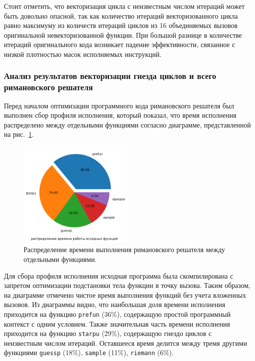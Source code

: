 Стоит отметить, что векторизация цикла с неизвестным числом итераций может быть довольно опасной, так как количество итераций векторизованного цикла равно максимуму из количеств итераций циклов из 16 объединяемых вызовов оригинальной невекторизованной функции.
При большой разнице в количестве итераций оригинального кода возникает падение эффективности, связанное с низкой плотностью масок\label{term:vector_mask_density4} исполняемых инструкций.

\subsubsection{Анализ результатов векторизации гнезда циклов и всего римановского решателя}

Перед началом оптимизации программного кода римановского решателя был выполнен сбор профиля исполнения\label{term:execution_profile2}, который показал, что время исполнения распределено между отдельными функциями согласно диаграмме, представленной на рис.~\ref{fig:text_4_vec_riem_exe_prof}.

\begin{figure}
\centering
\includegraphics[width=0.5\textwidth]{pics/text_4_vec_riemann/exe_prof.png}
\singlespacing
{}\caption{Распределение времени выполнения римановского решателя между отдельными функциями.}
\label{fig:text_4_vec_riem_exe_prof}
\end{figure}

Для сбора профиля исполнения исходная программа была скомпилирована с запретом оптимизации подстановки тела функции в точку вызова.
Таким образом, на диаграмме отмечено чистое время выполнения функций без учета вложенных вызовов.
Из диаграммы видно, что наибольшая доля времени исполнения приходится на функцию \texttt{prefun} (36\%), содержащую простой программный контекст с одним условием.
Также значительная часть времени исполнения приходится на функцию \texttt{starpu} (29\%), содержащую гнездо циклов с неизвестным числом итераций.
Оставшееся время делится между тремя другими функциями \texttt{guessp} (18\%), \texttt{sample} (11\%), \texttt{riemann} (6\%).


